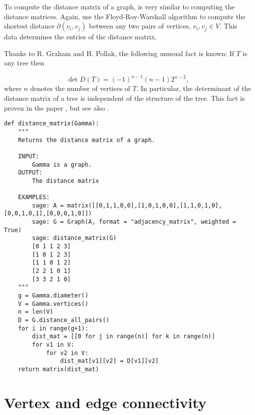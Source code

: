 To compute the distance matrix of a graph, is very
similar to computing the distance matrices.
Again, use the Floyd-Roy-Warshall
algorithm to compute the shortest distance
$\partial(v_i,v_j)$ between any two pairs of vertices,
$v_i,v_j\in V$. This data determines the entries of
the distance matrix.

\begin{remark}
{\rm
Thanks to R. Graham and H. Pollak, the following unusual fact is
known:
If $T$ is any tree then

\[
\det D(T)=(-1)^{n-1}(n-1)2^{n-2},
\]
where $n$ denotes the number of vertices of $T$.
In particular, the determinant of the distance matrix of a tree is
independent of the structure of the tree.  This fact is proven in the
paper \cite{GrahamPollak1971}, but see also
\cite{EdelbergEtAl1976}.
}
\end{remark}

\begin{lstlisting}
def distance_matrix(Gamma):
    """
    Returns the distance matrix of a graph.

    INPUT:
        Gamma is a graph.
    OUTPUT:
        The distance matrix

    EXAMPLES:
        sage: A = matrix([[0,1,1,0,0],[1,0,1,0,0],[1,1,0,1,0],[0,0,1,0,1],[0,0,0,1,0]])
        sage: G = Graph(A, format = "adjacency_matrix", weighted = True)
        sage: distance_matrix(G)
        [0 1 1 2 3]
        [1 0 1 2 3]
        [1 1 0 1 2]
        [2 2 1 0 1]
        [3 3 2 1 0]
    """
    g = Gamma.diameter()
    V = Gamma.vertices()
    n = len(V)
    D = G.distance_all_pairs()
    for i in range(g+1):
        dist_mat = [[0 for j in range(n)] for k in range(n)]
        for v1 in V:
            for v2 in V:
                dist_mat[v1][v2] = D[v1][v2]
    return matrix(dist_mat)
\end{lstlisting}



\section{Vertex and edge connectivity}


